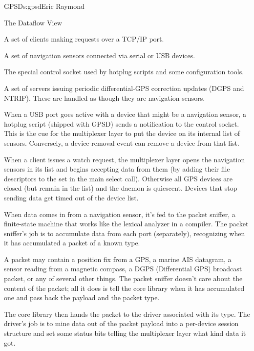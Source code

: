 \begin{aosachapter}{GPSD}{s:gpsd}{Eric Raymond}
\begin{aosasect1}{The Dataflow View}
\begin{aosaenumerate}

  \item A set of clients making requests over a TCP/IP port.

  \item A set of navigation sensors connected via serial or USB
    devices.

  \item The special control socket used by hotplug scripts and some
    configuration tools.

  \item A set of servers issuing periodic differential-GPS correction
    updates (DGPS and NTRIP).  These are handled as though they are
    navigation sensors.

\end{aosaenumerate}

When a USB port goes active with a device that might be a navigation
sensor, a hotplug script (shipped with GPSD) sends a notification to
the control socket.  This is the cue for the multiplexer layer to put
the device on its internal list of sensors.  Conversely, a
device-removal event can remove a device from that list.

When a client issues a watch request, the multiplexer layer opens the
navigation sensors in its list and begins accepting data from them (by
adding their file descriptors to the set in the main select
call). Otherwise all GPS devices are closed (but remain in the list)
and the daemon is quiescent. Devices that stop sending data get timed
out of the device list.


When data comes in from a navigation sensor, it's fed to the packet
sniffer, a finite-state machine that works like the lexical analyzer
in a compiler.  The packet sniffer's job is to accumulate data from
each port (separately), recognizing when it has accumulated a packet
of a known type.

A packet may contain a position fix from a GPS, a marine AIS datagram,
a sensor reading from a magnetic compass, a DGPS (Differential GPS)
broadcast packet, or any
of several other things.  The packet sniffer doesn't care about the 
content of the packet; all it does is tell the core library when it
has accumulated one and pass back the payload and the packet type.

The core library then hands the packet to the driver associated with
its type.  The driver's job is to mine data out of the packet payload
into a per-device session structure and set some status bits telling
the multiplexer layer what kind data it got.


\end{aosasect1}
\end{aosachapter}
